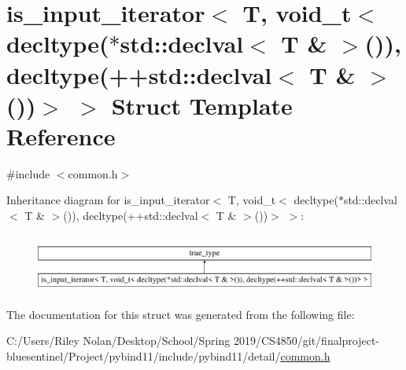\hypertarget{structis__input__iterator_3_01_t_00_01void__t_3_01decltype_07_5std_1_1declval_3_01_t_01_6_01_4_07d75bfb9a8f56371f7d25507c315f9a0}{}\section{is\+\_\+input\+\_\+iterator$<$ T, void\+\_\+t$<$ decltype($\ast$std\+::declval$<$ T \& $>$()), decltype(++std\+::declval$<$ T \& $>$())$>$ $>$ Struct Template Reference}
\label{structis__input__iterator_3_01_t_00_01void__t_3_01decltype_07_5std_1_1declval_3_01_t_01_6_01_4_07d75bfb9a8f56371f7d25507c315f9a0}


{\ttfamily \#include $<$common.\+h$>$}

Inheritance diagram for is\+\_\+input\+\_\+iterator$<$ T, void\+\_\+t$<$ decltype($\ast$std\+::declval$<$ T \& $>$()), decltype(++std\+::declval$<$ T \& $>$())$>$ $>$\+:\begin{figure}[H]
\begin{center}
\leavevmode
\includegraphics[height=1.941074cm]{structis__input__iterator_3_01_t_00_01void__t_3_01decltype_07_5std_1_1declval_3_01_t_01_6_01_4_07d75bfb9a8f56371f7d25507c315f9a0}
\end{center}
\end{figure}


The documentation for this struct was generated from the following file\+:\begin{DoxyCompactItemize}
\item 
C\+:/\+Users/\+Riley Nolan/\+Desktop/\+School/\+Spring 2019/\+C\+S4850/git/finalproject-\/bluesentinel/\+Project/pybind11/include/pybind11/detail/\mbox{\hyperlink{detail_2common_8h}{common.\+h}}\end{DoxyCompactItemize}
